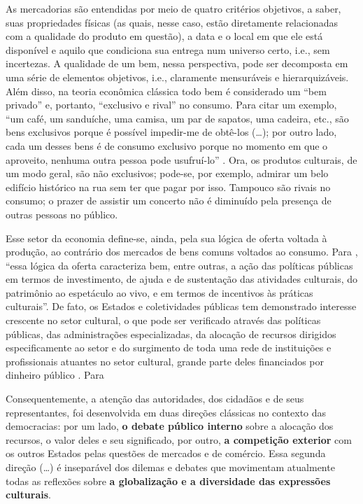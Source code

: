 \documentclass[a4paper, 12pt, openright, oneside, german, french, english, brazil]{abntex2}
\begin{document}
	As mercadorias são entendidas por meio de quatro critérios objetivos, a saber, suas propriedades físicas (as quais, nesse caso, estão diretamente relacionadas com a qualidade do produto em questão), a data e o local em que ele está disponível e aquilo que condiciona sua entrega num universo certo, i.e., sem incertezas. A qualidade de um bem, nessa perspectiva, pode ser decomposta em uma série de elementos objetivos, i.e., claramente mensuráveis e hierarquizáveis. Além disso, na teoria econômica clássica todo bem é considerado um ``bem privado'' e, portanto, ``exclusivo e rival'' no consumo. Para citar um exemplo, ``um café, um sanduíche, uma camisa, um par de sapatos, uma cadeira, etc., são bens exclusivos porque é possível impedir-me de obtê-los (\ldots); por outro lado, cada um desses bens é de consumo exclusivo porque no momento em que o aproveito, nenhuma outra pessoa pode usufruí-lo'' \cite[p. 29]{tolila2007cultura}. Ora, os produtos culturais, de um modo geral, são não exclusivos; pode-se, por exemplo, admirar um belo edifício histórico na rua sem ter que pagar por isso. Tampouco são rivais no consumo; o prazer de assistir um concerto não é diminuído pela presença de outras pessoas no público.
	
	Esse setor da economia define-se, ainda, pela sua lógica de oferta voltada à produção, ao contrário dos mercados de bens comuns voltados ao consumo. Para , ``essa lógica da oferta caracteriza bem, entre outras, a ação das políticas públicas em termos de investimento, de ajuda e de sustentação das atividades culturais, do patrimônio ao espetáculo ao vivo, e em termos de incentivos às práticas culturais''. De fato, os Estados e coletividades públicas tem demonstrado interesse crescente no setor cultural, o que pode ser verificado através das políticas públicas, das administrações especializadas, da alocação de recursos dirigidos especificamente ao setor e do surgimento de toda uma rede de instituições e profissionais atuantes no setor cultural, grande parte deles financiados por dinheiro público \cite{tolila2007cultura}. Para 
	
	\begin{citacao}
		Consequentemente, a atenção das autoridades, dos cidadãos e de seus representantes, foi desenvolvida em duas direções clássicas no contexto das democracias: por um lado, \textbf{o debate público interno} sobre a alocação dos recursos, o valor deles e seu significado, por outro, \textbf{a competição exterior} com os outros Estados pelas questões de mercados e de comércio. Essa segunda direção (\ldots) é inseparável dos dilemas e debates que movimentam atualmente todas as reflexões sobre \textbf{a globalização e a diversidade das expressões culturais}. \cite[p. 71-2]{tolila2007cultura}
	\end{citacao}
	
\end{document}
